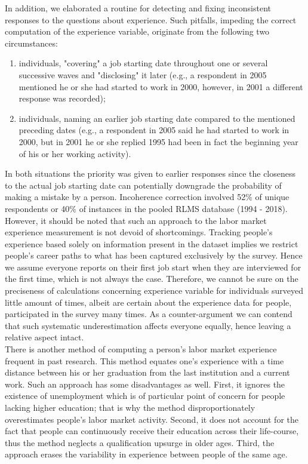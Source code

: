 \documentclass[12pt,a4paper]{article}
\begin{document}
In addition, we elaborated a routine for detecting and fixing inconsistent responses to the questions about experience. Such pitfalls, impeding the correct computation of the experience variable, originate from the following two circumstances:

\begin{enumerate}
\item individuals, "covering" a job starting date throughout one or several successive waves and "disclosing" it later (e.g., a respondent in 2005 mentioned he or she had started to work in 2000, however, in 2001 a different response was recorded); 

\item individuals, naming an earlier job starting date compared to the mentioned preceding dates (e.g., a respondent in 2005 said he had started to work in 2000, but in 2001 he or she replied 1995 had been in fact the beginning year of his or her working activity). 
\end{enumerate}

In both situations the priority was given to earlier responses since the closeness to the actual job starting date can potentially downgrade the probability of making a mistake by a person. Incoherence correction involved 52\% of unique respondents or 40\% of instances in the pooled RLMS database (1994 - 2018). However, it should be noted that such an approach to the labor market experience measurement is not devoid of shortcomings. Tracking people's experience based solely on information present in the dataset implies we restrict people's career paths to what has been captured exclusively by the survey. Hence we assume everyone reports on their first job start when they are interviewed for the first time, which is not always the case. Therefore, we cannot be sure on the preciseness of calculations concerning experience variable for individuals surveyed little amount of times, albeit are certain about the experience data for people, participated in the survey many times. As a counter-argument we can contend that such systematic underestimation affects everyone equally, hence leaving a relative aspect intact.
\\

There is another method of computing a person's labor market experience frequent in past research. This method equates one's experience with a time distance between his or her graduation from the last institution and a current work. Such an approach has some disadvantages as well. First, it ignores the existence of unemployment which is of particular point of concern for people lacking higher education; that is why the method disproportionately overestimates people's labor market activity. Second, it does not account for the fact that people can continuously receive their education across their life-course, thus the method neglects a qualification upsurge in older ages. Third, the approach erases the variability in experience between people of the same age.
\\
\end{document}
